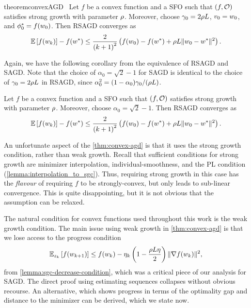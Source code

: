 \begin{restatable}{theorem}{convexAGD}~\label{thm:convex-agd}
    Let \( f \) be a convex function and \oracle{} a \ac{SFO} such that \( \rbr{f, \oracle{}} \) satisfies strong growth with parameter \( \sgc \).
    Moreover, choose \( \gamma_0 = 2 \sgc L \), \( v_0 = \w_0 \), and \( \phi_0^* = f(\w_0) \).
    Then \ac{RSAGD} converges as  
    \[ \E\sbr{f(\wk)} - f(\wopt) \leq \frac{2}{\rbr{k+1}^2}\rbr{f(\w_0) - f(\wopt) + \sgc L \norm{\w_0 - \wopt}^2 }. \]
\end{restatable}

Again, we have the following corollary from the equivalence of \ac{RSAGD} and \ac{SAGD}. 
Note that the choice of \( \alpha_0 = \sqrt{2} - 1 \) for \ac{SAGD} is identical to the choice of \( \gamma_0 = 2 \sgc L \) in \ac{RSAGD}, since \( \alpha_0^2 = (1 - \alpha_0) \gamma_0 / (\sgc L) \).

\begin{corollary}
    Let \( f \) be a convex function and \oracle{} a \ac{SFO} such that \( \rbr{f, \oracle{}} \) satisfies strong growth with parameter \( \sgc \).
    Moreover, choose \( \alpha_0 = \sqrt{2} - 1 \).
    Then \ac{RSAGD} converges as  
    \[ \E\sbr{f(\wk)} - f(\wopt) \leq \frac{2}{\rbr{k+1}^2}\rbr{f(\w_0) - f(\wopt) + \sgc L \norm{\w_0 - \wopt}^2 }. \]
\end{corollary}

 An unfortunate aspect of the \autoref{thm:convex-agd} is that it uses the strong growth condition, rather than weak growth.
 Recall that sufficient conditions for strong growth are minimizer interpolation, individual-smoothness, and the PL condition (\autoref{lemma:interpolation_to_sgc}). 
 Thus, requiring strong growth in this case has the \emph{flavour} of requiring \( f \) to be strongly-convex, but only leads to sub-linear convergence.
This is quite disappointing, but it is not obvious that the assumption can be relaxed.

The natural condition for convex functions used throughout this work is the weak growth condition.
The main issue using weak growth in \autoref{thm:convex-agd} is that we lose access to the progress condition 
\[ \Ek \sbr{f(\wkk)} \leq f(\wk) - \etak \rbr{1 - \frac{\sgc L \eta}{2}} \norm{\grad(\wk)}^2, \]
from \autoref{lemma:sgc-decrease-condition}, which was a critical piece of our analysis for \ac{SAGD}. 
The direct proof using estimating sequences collapses without obvious recourse.
An alternative, which shows progress in terms of the optimality gap and distance to the minimizer can be derived, which we state now.

